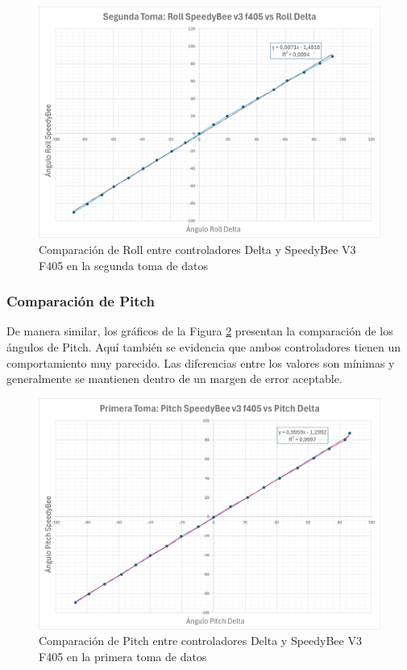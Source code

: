             \begin{figure}[H]
                \centering
                \includegraphics[width=5.5 in]{Imagenes/Pruebas/roll_2_compare.png}
                \caption{Comparación de Roll entre controladores Delta y SpeedyBee V3 F405 en la segunda toma de datos }
                \label{fig:comparacionRoll}
            \end{figure}


        \subsubsection{Comparación de Pitch}
            De manera similar, los gráficos de la Figura \ref{fig:comparacionPitch1} presentan la comparación de los ángulos de Pitch. Aquí también se evidencia que ambos controladores tienen un comportamiento muy parecido. Las diferencias entre los valores son mínimas y generalmente se mantienen dentro de un margen de error aceptable.


            \begin{figure}[H]
                \centering
                \includegraphics[width=5.5 in]{Imagenes/Pruebas/pitch_1_compare.png}
                \caption{Comparación de Pitch entre controladores Delta y SpeedyBee V3 F405 en la primera toma de datos }
                \label{fig:comparacionPitch1}
            \end{figure}


